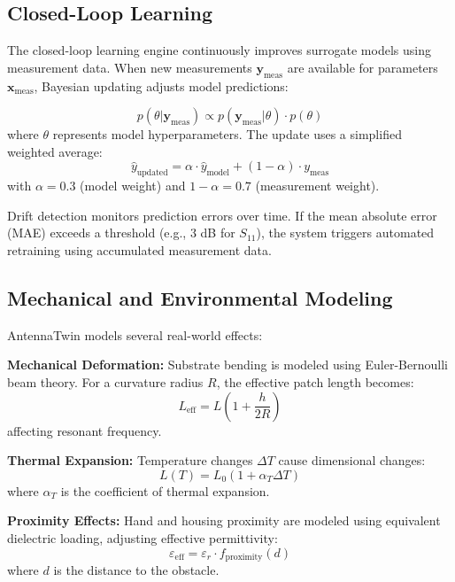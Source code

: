 \documentclass[conference]{IEEEtran}
\begin{document}
\subsection{Closed-Loop Learning}
The closed-loop learning engine continuously improves surrogate models using measurement data. When new measurements $\mathbf{y}_{\text{meas}}$ are available for parameters $\mathbf{x}_{\text{meas}}$, Bayesian updating adjusts model predictions:

\begin{equation}
p(\theta|\mathbf{y}_{\text{meas}}) \propto p(\mathbf{y}_{\text{meas}}|\theta) \cdot p(\theta)
\end{equation}
where $\theta$ represents model hyperparameters. The update uses a simplified weighted average:
\begin{equation}
\hat{y}_{\text{updated}} = \alpha \cdot \hat{y}_{\text{model}} + (1-\alpha) \cdot y_{\text{meas}}
\end{equation}
with $\alpha = 0.3$ (model weight) and $1-\alpha = 0.7$ (measurement weight).

Drift detection monitors prediction errors over time. If the mean absolute error (MAE) exceeds a threshold (e.g., 3 dB for $S_{11}$), the system triggers automated retraining using accumulated measurement data.

\subsection{Mechanical and Environmental Modeling}
AntennaTwin models several real-world effects:

\textbf{Mechanical Deformation:} Substrate bending is modeled using Euler-Bernoulli beam theory. For a curvature radius $R$, the effective patch length becomes:
\begin{equation}
L_{\text{eff}} = L \left(1 + \frac{h}{2R}\right)
\end{equation}
affecting resonant frequency.

\textbf{Thermal Expansion:} Temperature changes $\Delta T$ cause dimensional changes:
\begin{equation}
L(T) = L_0 (1 + \alpha_T \Delta T)
\end{equation}
where $\alpha_T$ is the coefficient of thermal expansion.

\textbf{Proximity Effects:} Hand and housing proximity are modeled using equivalent dielectric loading, adjusting effective permittivity:
\begin{equation}
\varepsilon_{\text{eff}} = \varepsilon_r \cdot f_{\text{proximity}}(d)
\end{equation}
where $d$ is the distance to the obstacle.
\end{document}
